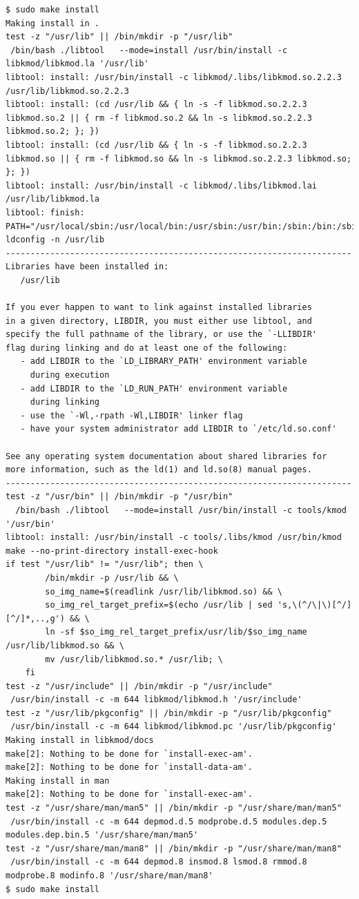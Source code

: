 {\begin{shaded}\begin{verbatim}
$ sudo make install
Making install in .
test -z "/usr/lib" || /bin/mkdir -p "/usr/lib"
 /bin/bash ./libtool   --mode=install /usr/bin/install -c   libkmod/libkmod.la '/usr/lib'
libtool: install: /usr/bin/install -c libkmod/.libs/libkmod.so.2.2.3 /usr/lib/libkmod.so.2.2.3
libtool: install: (cd /usr/lib && { ln -s -f libkmod.so.2.2.3 libkmod.so.2 || { rm -f libkmod.so.2 && ln -s libkmod.so.2.2.3 libkmod.so.2; }; })
libtool: install: (cd /usr/lib && { ln -s -f libkmod.so.2.2.3 libkmod.so || { rm -f libkmod.so && ln -s libkmod.so.2.2.3 libkmod.so; }; })
libtool: install: /usr/bin/install -c libkmod/.libs/libkmod.lai /usr/lib/libkmod.la
libtool: finish: PATH="/usr/local/sbin:/usr/local/bin:/usr/sbin:/usr/bin:/sbin:/bin:/sbin" ldconfig -n /usr/lib
----------------------------------------------------------------------
Libraries have been installed in:
   /usr/lib

If you ever happen to want to link against installed libraries
in a given directory, LIBDIR, you must either use libtool, and
specify the full pathname of the library, or use the `-LLIBDIR'
flag during linking and do at least one of the following:
   - add LIBDIR to the `LD_LIBRARY_PATH' environment variable
     during execution
   - add LIBDIR to the `LD_RUN_PATH' environment variable
     during linking
   - use the `-Wl,-rpath -Wl,LIBDIR' linker flag
   - have your system administrator add LIBDIR to `/etc/ld.so.conf'

See any operating system documentation about shared libraries for
more information, such as the ld(1) and ld.so(8) manual pages.
----------------------------------------------------------------------
test -z "/usr/bin" || /bin/mkdir -p "/usr/bin"
  /bin/bash ./libtool   --mode=install /usr/bin/install -c tools/kmod '/usr/bin'
libtool: install: /usr/bin/install -c tools/.libs/kmod /usr/bin/kmod
make --no-print-directory install-exec-hook
if test "/usr/lib" != "/usr/lib"; then \
        /bin/mkdir -p /usr/lib && \
        so_img_name=$(readlink /usr/lib/libkmod.so) && \
        so_img_rel_target_prefix=$(echo /usr/lib | sed 's,\(^/\|\)[^/][^/]*,..,g') && \
        ln -sf $so_img_rel_target_prefix/usr/lib/$so_img_name /usr/lib/libkmod.so && \
        mv /usr/lib/libkmod.so.* /usr/lib; \
    fi
test -z "/usr/include" || /bin/mkdir -p "/usr/include"
 /usr/bin/install -c -m 644 libkmod/libkmod.h '/usr/include'
test -z "/usr/lib/pkgconfig" || /bin/mkdir -p "/usr/lib/pkgconfig"
 /usr/bin/install -c -m 644 libkmod/libkmod.pc '/usr/lib/pkgconfig'
Making install in libkmod/docs
make[2]: Nothing to be done for `install-exec-am'.
make[2]: Nothing to be done for `install-data-am'.
Making install in man
make[2]: Nothing to be done for `install-exec-am'.
test -z "/usr/share/man/man5" || /bin/mkdir -p "/usr/share/man/man5"
 /usr/bin/install -c -m 644 depmod.d.5 modprobe.d.5 modules.dep.5 modules.dep.bin.5 '/usr/share/man/man5'
test -z "/usr/share/man/man8" || /bin/mkdir -p "/usr/share/man/man8"
 /usr/bin/install -c -m 644 depmod.8 insmod.8 lsmod.8 rmmod.8 modprobe.8 modinfo.8 '/usr/share/man/man8'
$ sudo make install
\end{verbatim}\end{shaded}}
